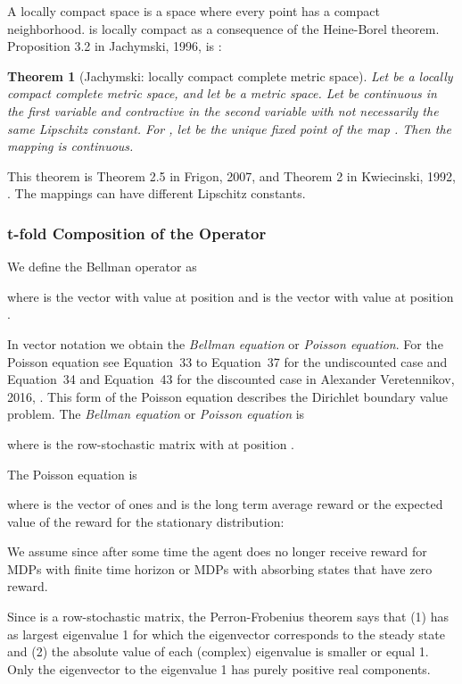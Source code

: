 \documentclass{article}
\newtheorem{theoremA}{Theorem}
\begin{document}
\begin{appendices}
A locally compact space is a space where  every point has a compact neighborhood.
 is locally compact as a consequence of the Heine-Borel theorem.
Proposition 3.2 in Jachymski, 1996, is \cite{Jachymski:96}:
\begin{theoremA}[Jachymski: locally compact complete metric space]
Let  be a locally compact complete metric space,
and let  be a
metric space. Let 
be continuous in the first variable and
contractive in the second variable with not necessarily the
same Lipschitz constant.
For , let 
be the unique fixed point of the map . Then the
mapping  is continuous.
\end{theoremA}
This theorem is Theorem 2.5 in Frigon, 2007,  \cite{Frigon:07}
and Theorem 2 in Kwiecinski, 1992, \cite{Kwiecinski:92}.
The mappings  can have different Lipschitz constants.

\subsubsection{t-fold Composition of the Operator}
\label{sec:At-fold}

We define the Bellman operator as

where  is the vector with value  at position 
and  is the vector with value
 at position .

In vector notation we obtain
the {\em Bellman equation} or {\em Poisson equation}.
For the Poisson equation see
Equation~33 to Equation~37 for the undiscounted case and Equation~34 and Equation~43 for the
discounted case in Alexander Veretennikov, 2016,
\cite{Veretennikov:16}.
This form of the Poisson equation describes the Dirichlet boundary
value problem.
The {\em Bellman equation} or {\em Poisson equation} is

where  is the row-stochastic matrix with
 at position .


The Poisson equation is
 
where  is the vector of ones and
 is the long term average reward or the expected 
value of the reward for the stationary distribution:
 
We assume  since after some time the agent does no longer
receive reward for MDPs with finite time horizon or MDPs with
absorbing states that have zero reward.




Since  is a row-stochastic matrix, the
Perron-Frobenius theorem says that (1)  has as largest eigenvalue 1 for which
the eigenvector corresponds to the steady state and
(2) the absolute value of each (complex) eigenvalue is smaller or equal 1.
Only the eigenvector to the eigenvalue 1 has purely positive real components.






\end{appendices}
\end{document}
